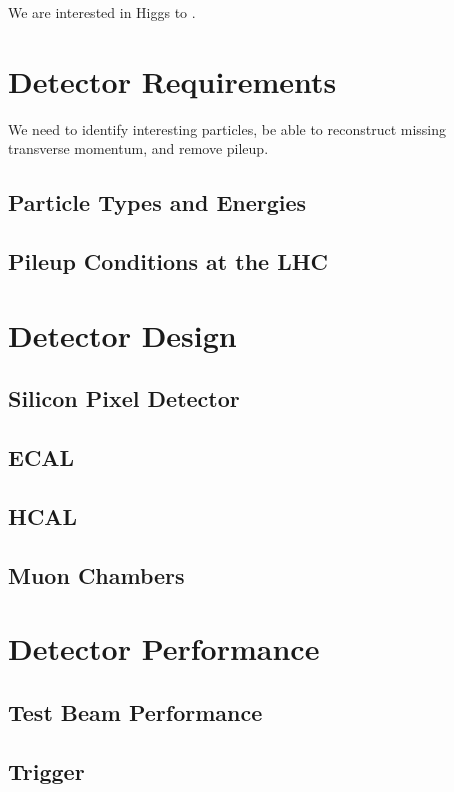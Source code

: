 We are interested in Higgs to \bb.

\section{Detector Requirements}

We need to identify interesting particles,
be able to reconstruct missing transverse momentum,
and remove pileup.

\subsection{Particle Types and Energies}

\subsection{Pileup Conditions at the LHC}

\section{Detector Design}

\subsection{Silicon Pixel Detector}

\subsection{ECAL}

\subsection{HCAL}

\subsection{Muon Chambers}

\section{Detector Performance}

\subsection{Test Beam Performance}

\subsection{Trigger}

